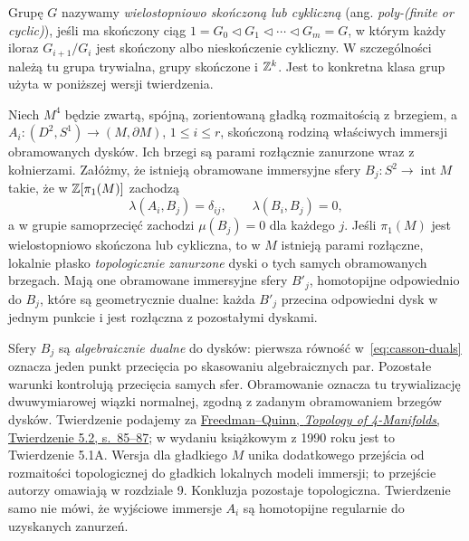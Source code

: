 Grupę $G$ nazywamy \emph{wielostopniowo skończoną
lub cykliczną} (ang. \emph{poly-(finite or cyclic)}),
jeśli ma skończony ciąg
$1=G_0\triangleleft G_1\triangleleft\cdots
\triangleleft G_m=G$, w którym każdy iloraz
$G_{i+1}/G_i$ jest skończony albo nieskończenie
cykliczny.
W szczególności należą tu grupa trywialna,
grupy skończone i $\mathbb{Z}^k$. Jest to konkretna
klasa grup użyta w poniższej wersji twierdzenia.

\begin{twierdzenie}
\label{thm:casson-disk-embedding}
Niech $M^4$ będzie zwartą, spójną, zorientowaną gładką
rozmaitością z brzegiem, a
$A_i:(D^2,S^1)\to(M,\partial M)$,
$1\leq i\leq r$, skończoną rodziną właściwych
immersji obramowanych dysków. Ich brzegi
są parami rozłącznie zanurzone wraz z kołnierzami.
Załóżmy, że istnieją obramowane immersyjne sfery
$B_j:S^2\to\operatorname{int}M$ takie, że w
$\mathbb{Z}[\pi_1(M)]$ zachodzą
\begin{equation}\label{eq:casson-duals}
 \lambda(A_i,B_j)=\delta_{ij},\qquad
 \lambda(B_i,B_j)=0,
\end{equation}
a w grupie samoprzecięć zachodzi $\mu(B_j)=0$
dla każdego $j$. Jeśli $\pi_1(M)$ jest
wielostopniowo skończona lub cykliczna, to w $M$
istnieją parami rozłączne, lokalnie płasko
\emph{topologicznie zanurzone} dyski o tych samych
obramowanych brzegach. Mają one obramowane immersyjne
sfery $B'_j$, homotopijne odpowiednio do $B_j$,
które są geometrycznie dualne: każda $B'_j$ przecina
odpowiedni dysk w jednym punkcie i jest rozłączna
z pozostałymi dyskami.
\end{twierdzenie}

Sfery $B_j$ są \emph{algebraicznie dualne} do
dysków: pierwsza równość w~\eqref{eq:casson-duals}
oznacza jeden punkt przecięcia po skasowaniu
algebraicznych par. Pozostałe warunki kontrolują
przecięcia samych sfer. Obramowanie oznacza tu
trywializację dwuwymiarowej wiązki normalnej,
zgodną z zadanym obramowaniem brzegów dysków.
Twierdzenie podajemy za
\href{https://archive.mpim-bonn.mpg.de/4789/2/FreedmanQuinn-TopologyOf4Manifolds-Reformatted2013.pdf}
{Freedman--Quinn, \emph{Topology of 4-Manifolds},
Twierdzenie 5.2, s.\ 85--87}; w wydaniu książkowym
z 1990 roku jest to Twierdzenie 5.1A. Wersja dla gładkiego
$M$ unika dodatkowego przejścia od rozmaitości
topologicznej do gładkich lokalnych modeli
immersji; to przejście autorzy omawiają
w rozdziale 9. Konkluzja pozostaje topologiczna.
Twierdzenie samo nie mówi, że wyjściowe immersje $A_i$
są homotopijne regularnie do uzyskanych zanurzeń.

